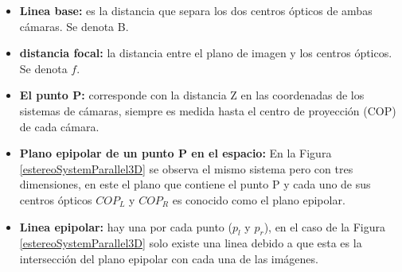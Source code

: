 \begin{itemize}
\item \textbf{Linea base:} es la distancia que separa los dos centros ópticos de ambas cámaras. Se denota B.
\item \textbf{distancia focal:} la distancia entre el plano de imagen y los centros ópticos. Se denota $f$.
\item\textbf{ El punto P:} corresponde con la distancia Z en las coordenadas de los sistemas de cámaras, siempre es medida hasta el centro de proyección (COP) de cada cámara. 
\item \textbf{Plano epipolar de un punto P en el espacio:} En la Figura \ref{estereoSystemParallel3D} se observa el mismo sistema pero con tres dimensiones, en este el plano que contiene el punto P y cada uno de sus centros ópticos $COP_{L}$ y $COP_{R}$ es conocido como el plano epipolar.
\item\textbf{ Linea epipolar:} hay una por cada punto ($p_{l}$ y $p_{r}$), en el caso de la Figura \ref{estereoSystemParallel3D} solo existe una linea debido a que esta es la intersección del plano epipolar con cada una de las imágenes.
\end{itemize}
